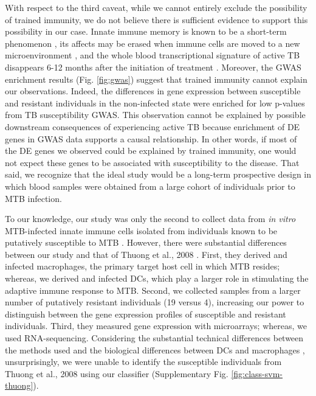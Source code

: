 \documentclass[fleqn,10pt]{wlscirep}
\begin{document}
With respect to the third caveat, while we cannot entirely exclude the
possibility of trained immunity, we do not believe there is sufficient
evidence to support this possibility in our case. Innate immune memory
is known to be a short-term phenomenon \cite{Netea2016}, its affects
may be erased when immune cells are moved to a new microenvironment
\cite{Lavin2014}, and the whole blood transcriptional signature of
active TB disappears 6-12 months after the initiation of treatment
\cite{Berry2010, Bloom2012}. Moreover, the GWAS enrichment results
(Fig. \ref{fig:gwas}) suggest that trained immunity cannot explain our
observations. Indeed, the differences in gene expression between
susceptible and resistant individuals in the non-infected state were
enriched for low p-values from TB susceptibility GWAS. This
observation cannot be explained by possible downstream consequences of
experiencing active TB because enrichment of DE genes in GWAS data
supports a causal relationship. In other words, if most of the DE
genes we observed could be explained by trained immunity, one would
not expect these genes to be associated with susceptibility to the
disease. That said, we recognize that the ideal study would be a
long-term prospective design in which blood samples were obtained from
a large cohort of individuals prior to MTB infection.

To our knowledge, our study was only the second to collect data from
\emph{in vitro} MTB-infected innate immune cells isolated from
individuals known to be putatively susceptible to MTB
\cite{Thuong2008}. However, there were substantial differences between
our study and that of Thuong et al., 2008 \cite{Thuong2008}. First,
they derived and infected macrophages, the primary target host cell in
which MTB resides; whereas, we derived and infected DCs, which play a
larger role in stimulating the adaptive immune response to MTB.
Second, we collected samples from a larger number of putatively
resistant individuals (19 versus 4), increasing our power to
distinguish between the gene expression profiles of susceptible and
resistant individuals. Third, they measured gene expression with
microarrays; whereas, we used RNA-sequencing. Considering the
substantial technical differences between the methods used and the
biological differences between DCs and macrophages
\cite{Chaussabel2003,Tailleux2008}, unsurprisingly, we were unable to
identify the susceptible individuals from Thuong et al., 2008
\cite{Thuong2008} using our classifier (Supplementary Fig.
\ref{fig:class-svm-thuong}).
\end{document}
